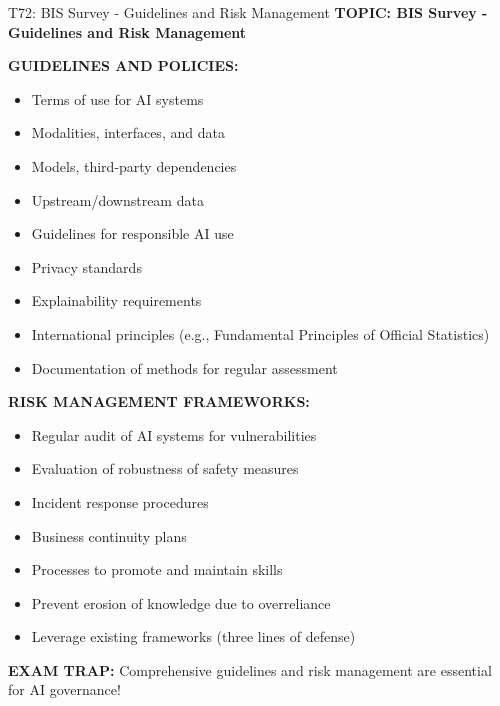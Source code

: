 \documentclass[8pt]{beamer}
\begin{document}
	\begin{frame}{T72: BIS Survey - Guidelines and Risk Management}
		\fontsize{6.5}{7.5}\selectfont
		\textbf{TOPIC: BIS Survey - Guidelines and Risk Management}
		
		\vspace{0.1cm}
		\textbf{GUIDELINES AND POLICIES:}
		\begin{itemize}
			\item Terms of use for AI systems
			\item Modalities, interfaces, and data
			\item Models, third-party dependencies
			\item Upstream/downstream data
			\item Guidelines for responsible AI use
			\item Privacy standards
			\item Explainability requirements
			\item International principles (e.g., Fundamental Principles of Official Statistics)
			\item Documentation of methods for regular assessment
		\end{itemize}
		
		\vspace{0.1cm}
		\textbf{RISK MANAGEMENT FRAMEWORKS:}
		\begin{itemize}
			\item Regular audit of AI systems for vulnerabilities
			\item Evaluation of robustness of safety measures
			\item Incident response procedures
			\item Business continuity plans
			\item Processes to promote and maintain skills
			\item Prevent erosion of knowledge due to overreliance
			\item Leverage existing frameworks (three lines of defense)
		\end{itemize}
		
		\textcolor{myred}{\textbf{EXAM TRAP:}} Comprehensive guidelines and risk management are \textcolor{myblue}{essential for AI governance}!
	\end{frame}
	
\end{document}
